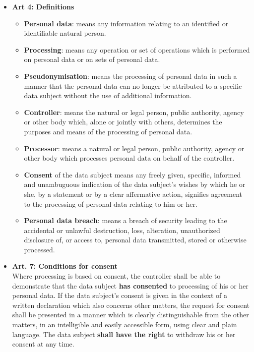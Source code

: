 \begin{itemize}
    \item \textbf{Art 4: Definitions}
    \begin{itemize}
        \item \textbf{Personal data}: means any information relating to an identified or identifiable natural person.
        \item \textbf{Processing}: means any operation or set of operations which is performed on personal data or on sets of personal data.
        \item \textbf{Pseudonymisation}: means the processing of personal data in such a manner that the personal data can no longer be attributed to a specific data subject without the use of additional information.
        \item \textbf{Controller}: means the natural or legal person, public authority, agency or other body which, alone or jointly with others, determines the purposes and means of the processing of personal data.
        \item \textbf{Processor}: means a natural or legal person, public authority, agency or other body which processes personal data on behalf of the controller.
        \item \textbf{Consent} of the data subject means any freely given, specific, informed and unambuguous indication of the data subject's wishes by which he or she, by a statement or by a clear affermative action, signifies agreement to the processing of personal data relating to him or her.
        \item \textbf{Personal data breach}: means a breach of security leading to the accidental or unlawful destruction, loss, alteration, unauthorized disclosure of, or access to, personal data transmitted, stored or otherwise processed.
    \end{itemize}
    \item \textbf{Art. 7: Conditions for consent}
    \\ Where processing is based on consent, the controller shall be able to demonstrate that the data subject \textbf{has consented} to processing of his or her personal data. If the data subject's consent is given in the context of a written declaration which also concerns other matters, the request for consent shall be presented in a manner which is clearly distinguishable from the other matters, in an intelligible and easily accessible form, using clear and plain language. The data subject \textbf{shall have the right} to withdraw his or her consent at any time.

\end{itemize}
